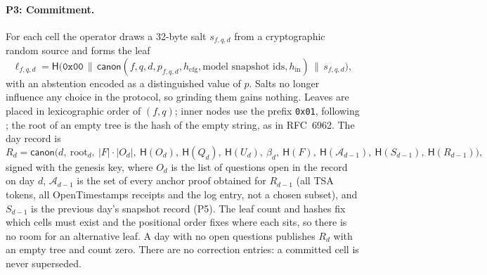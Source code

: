 \documentclass[11pt]{article}
\newcommand{\Hh}{\mathsf{H}}
\newcommand{\canon}{\mathsf{canon}}
\begin{document}
\paragraph{P3: Commitment.} For each cell the operator draws a 32-byte salt $s_{f,q,d}$ from a cryptographic random source and forms the leaf
\begin{equation}
  \ell_{f,q,d} = \Hh\bigl(\texttt{0x00} \,\|\, \canon(f, q, d, p_{f,q,d}, h_{\mathrm{cfg}}, \text{model snapshot ids}, h_{\mathrm{in}}) \,\|\, s_{f,q,d}\bigr),
\end{equation}
with an abstention encoded as a distinguished value of $p$. Salts no longer influence any choice in the protocol, so grinding them gains nothing. Leaves are placed in lexicographic order of $(f,q)$; inner nodes use the prefix \texttt{0x01}, following \citet{rfc6962}; the root of an empty tree is the hash of the empty string, as in RFC~6962. The day record is
\begin{equation}
  R_d = \canon\bigl(d,\ \mathrm{root}_d,\ |F|\cdot|O_d|,\ \Hh(O_d),\ \Hh(Q_d),\ \Hh(U_d),\ \beta_d,\ \Hh(F),\ \Hh(\mathcal{A}_{d-1}),\ \Hh(S_{d-1}),\ \Hh(R_{d-1})\bigr),
\end{equation}
signed with the genesis key, where $O_d$ is the list of questions open in the record on day $d$, $\mathcal{A}_{d-1}$ is the set of every anchor proof obtained for $R_{d-1}$ (all TSA tokens, all OpenTimestamps receipts and the log entry, not a chosen subset), and $S_{d-1}$ is the previous day's snapshot record (P5). The leaf count and hashes fix which cells must exist and the positional order fixes where each sits, so there is no room for an alternative leaf. A day with no open questions publishes $R_d$ with an empty tree and count zero. There are no correction entries: a committed cell is never superseded.
\end{document}

